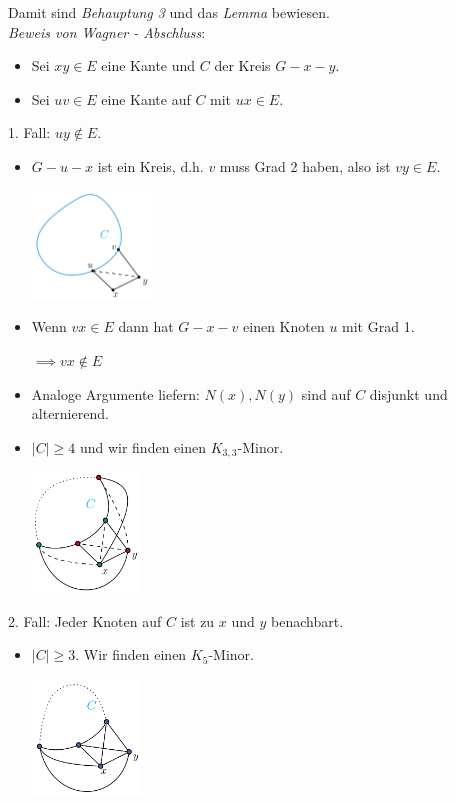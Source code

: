 Damit sind \textit{Behauptung 3} und das \textit{Lemma} bewiesen.\\

\textit{Beweis von Wagner - Abschluss}: 
\begin{itemize}
	\item Sei $xy\in E$ eine Kante und $C$ der Kreis $G-x-y$.
	\item Sei $uv\in E$ eine Kante auf $C$ mit $ux\in E$.
\end{itemize}

1. Fall: $uy\notin E$.
\begin{itemize}
	\item $G-u-x$ ist ein Kreis, d.h. $v$ muss Grad 2 haben, also ist $vy\in E$.
	\begin{center}
		\includegraphics[width=0.25\textwidth]{images/wagner-17.png}
	\end{center}
	\item Wenn $vx\in E$ dann hat $G-x-v$ einen Knoten $u$ mit Grad 1. \Lightning
	
	$\implies vx\notin E$
	\item Analoge Argumente liefern: $N(x), N(y)$ sind auf $C$ disjunkt und alternierend.
	\item $|C|\geq 4$ und wir finden einen $K_{3,3}$-Minor.
	\begin{center}
		\includegraphics[width=0.23\textwidth]{images/wagner-18.png}
	\end{center}
\end{itemize}

2. Fall: Jeder Knoten auf $C$ ist zu $x$ und $y$ benachbart.
\begin{itemize}
	\item $|C|\geq 3$. Wir finden einen $K_5$-Minor.
	\begin{center}
		\includegraphics[width=0.23\textwidth]{images/wagner-19.png}
	\end{center}
\end{itemize}

